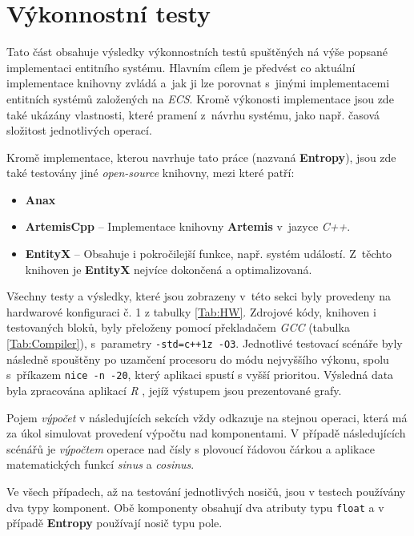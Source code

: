 \section{Výkonnostní testy}

Tato část obsahuje výsledky výkonnostních testů spuštěných ná výše popsané implementaci entitního systému. Hlavním cílem je předvést co aktuální implementace knihovny zvládá a~jak ji lze porovnat s~jinými implementacemi entitních systémů založených na \emph{ECS}. Kromě výkonosti implementace jsou zde také ukázány vlastnosti, které pramení z~návrhu systému, jako např. časová složitost jednotlivých operací.

Kromě implementace, kterou navrhuje tato práce (nazvaná \textbf{Entropy}), jsou zde také testovány jiné \emph{open-source} knihovny, mezi které patří:
\begin{itemize}
	\item \textbf{Anax} \cite{Anax}
	\item \textbf{ArtemisCpp} \cite{ArtemisCpp} -- Implementace knihovny \textbf{Artemis} \cite{ArtemisJava} v~jazyce \emph{C++}.
	\item \textbf{EntityX} \cite{EntityX} -- Obsahuje i pokročilejší funkce, např. systém událostí. Z~těchto knihoven je \textbf{EntityX} nejvíce dokončená a optimalizovaná.
\end{itemize}

Všechny testy a výsledky, které jsou zobrazeny v~této sekci byly provedeny na hardwarové konfiguraci č. 1 z tabulky \ref{Tab:HW}. Zdrojové kódy, knihoven i testovaných bloků, byly přeloženy pomocí překladačem \emph{GCC} (tabulka \ref{Tab:Compiler}), s~parametry \texttt{-std=c++1z -O3}. Jednotlivé testovací scénáře byly následně spouštěny po uzamčení procesoru do módu nejvyššího výkonu, spolu s~příkazem \texttt{nice -n -20}, který aplikaci spustí s vyšší prioritou. Výsledná data byla zpracována aplikací \emph{R} \cite{RHome}, jejíž výstupem jsou prezentované grafy.

Pojem \emph{výpočet} v následujících sekcích vždy odkazuje na stejnou operaci, která má za úkol simulovat provedení výpočtu nad komponentami. V případě následujících scénářů je \emph{výpočtem} operace nad čísly s plovoucí řádovou čárkou a aplikace matematických funkcí \emph{sinus} a \emph{cosinus}.

Ve všech případech, až na testování jednotlivých nosičů, jsou v testech používány dva typy komponent. Obě komponenty obsahují dva atributy typu \texttt{float} a v případě \textbf{Entropy} používají nosič typu pole. 

